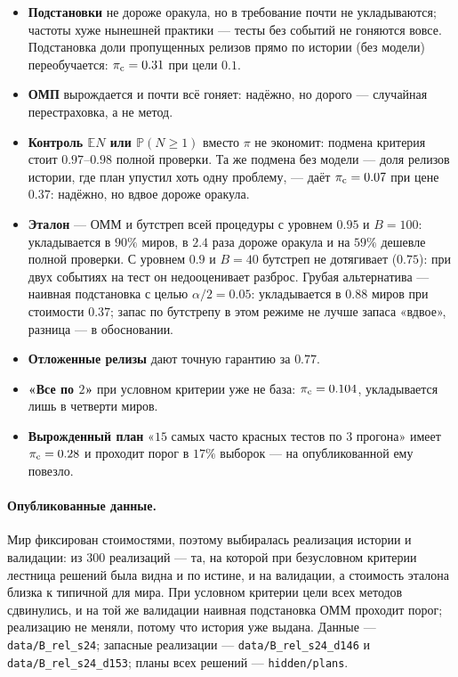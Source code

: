 \documentclass[11pt,a4paper]{article}
\newcommand{\E}{\mathbb{E}}
\newcommand{\Prob}{\mathbb{P}}
\theoremstyle{plain}
\theoremstyle{definition}
\begin{document}
\begin{itemize}
\item \textbf{Подстановки} не дороже оракула, но в требование почти не укладываются; частоты хуже нынешней практики --- тесты без событий не гоняются вовсе. Подстановка доли пропущенных релизов прямо по истории (без модели) переобучается: $\pi_{\rm c}=0.31$ при цели $0.1$.
\item \textbf{ОМП} вырождается и почти всё гоняет: надёжно, но дорого --- случайная перестраховка, а не метод.
\item \textbf{Контроль $\E N$ или $\Prob(N\ge1)$} вместо $\pi$ не экономит: подмена критерия стоит $0.97$--$0.98$ полной проверки. Та же подмена без модели --- доля релизов истории, где план упустил хоть одну проблему, --- даёт $\pi_{\rm c}=0.07$ при цене $0.37$: надёжно, но вдвое дороже оракула.
\item \textbf{Эталон} --- ОММ и бутстреп всей процедуры с уровнем $0.95$ и $B=100$: укладывается в $90\%$ миров, в $2.4$ раза дороже оракула и на $59\%$ дешевле полной проверки. С уровнем $0.9$ и $B=40$ бутстреп не дотягивает ($0.75$): при двух событиях на тест он недооценивает разброс. Грубая альтернатива --- наивная подстановка с целью $\alpha/2=0.05$: укладывается в $0.88$ миров при стоимости $0.37$; запас по бутстрепу в этом режиме не лучше запаса «вдвое», разница --- в обосновании.
\item \textbf{Отложенные релизы} дают точную гарантию за $0.77$.
\item \textbf{«Все по $2$»} при условном критерии уже не база: $\pi_{\rm c}=0.104$, укладывается лишь в четверти миров.
\item \textbf{Вырожденный план} «$15$ самых часто красных тестов по $3$ прогона» имеет $\pi_{\rm c}=0.28$ и проходит порог в $17\%$ выборок --- на опубликованной ему повезло.
\end{itemize}

\paragraph{Опубликованные данные.} Мир фиксирован стоимостями, поэтому выбиралась реализация истории и валидации: из $300$ реализаций --- та, на которой при безусловном критерии лестница решений была видна и по истине, и на валидации, а стоимость эталона близка к типичной для мира. При условном критерии цели всех методов сдвинулись, и на той же валидации наивная подстановка ОММ проходит порог; реализацию не меняли, потому что история уже выдана. Данные --- \texttt{data/B\_rel\_s24}; запасные реализации --- \texttt{data/B\_rel\_s24\_d146} и \texttt{data/B\_rel\_s24\_d153}; планы всех решений --- \texttt{hidden/plans}.
\end{document}
